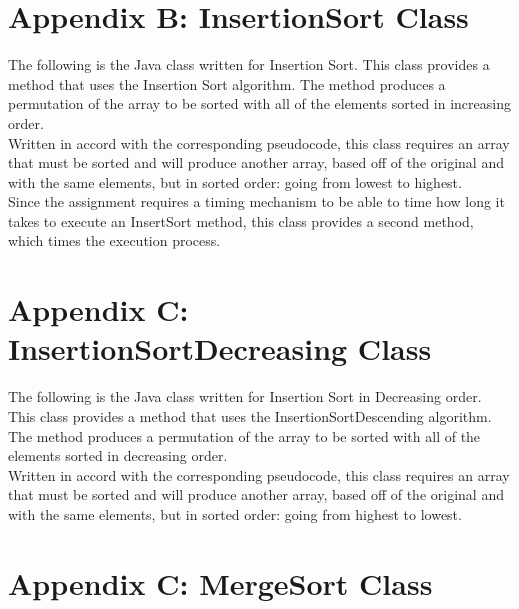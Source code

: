 \documentclass[12pt]{article}
\begin{document}
\hrulefill 

\pagebreak

\section*{Appendix B: InsertionSort Class}

The following is the Java class written for Insertion Sort. This class provides a method that uses the Insertion Sort algorithm. The method produces a permutation of the array to be sorted with all of the elements sorted in increasing order. \\

Written in accord with the corresponding pseudocode, this class requires an array that must be sorted and will produce another array, based off of the original and with the same elements, but in sorted order: going from lowest to highest. \\

Since the assignment requires a timing mechanism to be able to time how long it takes to execute an InsertSort method, this class provides a second method, which times the execution process. 

\hrulefill 

\pagebreak

\section*{Appendix C: InsertionSortDecreasing Class}

The following is the Java class written for Insertion Sort in Decreasing order. This class provides a method that uses the InsertionSortDescending algorithm. The method produces a permutation of the array to be sorted with all of the elements sorted in decreasing order. \\

Written in accord with the corresponding pseudocode, this class requires an array that must be sorted and will produce another array, based off of the original and with the same elements, but in sorted order: going from highest to lowest. \\


\hrulefill 

\pagebreak

\section*{Appendix C: MergeSort Class}
\end{document}
